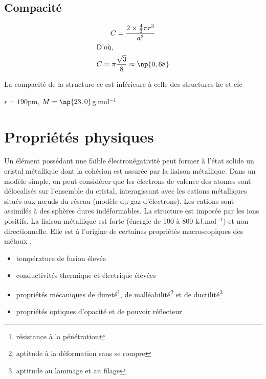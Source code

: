 \subsection{Compacité}
\begin{gather}
    C = \frac{2\times \frac{4}{3} \pi r^3}{a^3}\\
    \intertext{D'où,}
    C = \pi \frac{\sqrt{3}}{8} \approx \np{0,68}
\end{gather}
\begin{rem}
    La compacité de la structure cc est inférieure à celle
    des structures hc et cfc
\end{rem}
\begin{ex}[Na]
    $r = 190$pm, $M = \np{23,0}$g.mol$^{-1}$
\end{ex}

\section{Propriétés physiques}
Un élément possédant une faible électronégativité peut former
à l’état solide un cristal métallique dont la cohésion est
assurée par la liaison métallique.
Dans un modèle simple, on peut considérer que les électrons
de valence des atomes sont délocalisés sur l’ensemble du
cristal, interagissant avec les cations métalliques situés
aux n\oe uds du réseau (modèle du gaz d’électrons).
Les cations sont assimilés à des sphères dures
indéformables. La structure est imposée par les ions positifs.
La liaison métallique est forte (énergie de 100 à 800 kJ.mol$^{-1}$)
et non directionnelle. Elle est à l’origine de certaines
propriétés macroscopiques des métaux :
\begin{itemize}
    \item température de fusion élevée 
    \item conductivités thermique et électrique élevées
    \item propriétés mécaniques de dureté\footnote{résistance à
        la pénétration}, de malléabilité\footnote{aptitude à la
        déformation sans se rompre} et de
        ductilité\footnote{aptitude au laminage et au filage}
    \item propriétés optiques d'opacité et de pouvoir réflecteur
\end{itemize}

